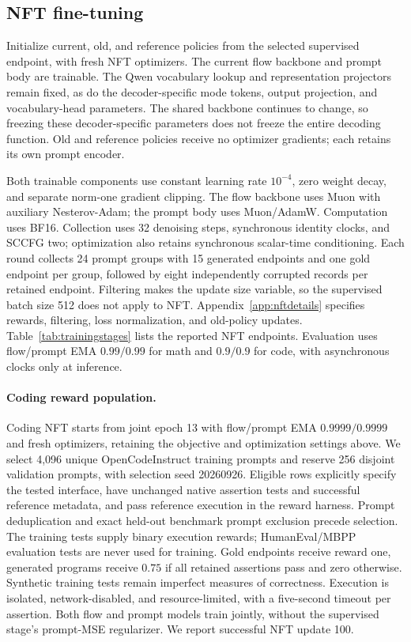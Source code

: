 \documentclass{article}
\begin{document}
\subsection{NFT fine-tuning}
\label{app:nfttraining}

Initialize current, old, and reference policies from the selected supervised endpoint, with fresh NFT optimizers. The current flow backbone and prompt body are trainable. The Qwen vocabulary lookup and representation projectors remain fixed, as do the decoder-specific mode tokens, output projection, and vocabulary-head parameters. The shared backbone continues to change, so freezing these decoder-specific parameters does not freeze the entire decoding function. Old and reference policies receive no optimizer gradients; each retains its own prompt encoder.

Both trainable components use constant learning rate $10^{-4}$, zero weight decay, and separate norm-one gradient clipping. The flow backbone uses Muon with auxiliary Nesterov-Adam; the prompt body uses Muon/AdamW. Computation uses BF16. Collection uses 32 denoising steps, synchronous identity clocks, and SCCFG two; optimization also retains synchronous scalar-time conditioning. Each round collects 24 prompt groups with 15 generated endpoints and one gold endpoint per group, followed by eight independently corrupted records per retained endpoint. Filtering makes the update size variable, so the supervised batch size 512 does not apply to NFT. Appendix~\ref{app:nftdetails} specifies rewards, filtering, loss normalization, and old-policy updates. Table~\ref{tab:trainingstages} lists the reported NFT endpoints. Evaluation uses flow/prompt EMA $0.99/0.99$ for math and $0.9/0.9$ for code, with asynchronous clocks only at inference.

\paragraph{Coding reward population.}
Coding NFT starts from joint epoch 13 with flow/prompt EMA $0.9999/0.9999$ and fresh optimizers, retaining the objective and optimization settings above. We select 4,096 unique OpenCodeInstruct training prompts and reserve 256 disjoint validation prompts, with selection seed 20260926. Eligible rows explicitly specify the tested interface, have unchanged native assertion tests and successful reference metadata, and pass reference execution in the reward harness. Prompt deduplication and exact held-out benchmark prompt exclusion precede selection. The training tests supply binary execution rewards; HumanEval/MBPP evaluation tests are never used for training. Gold endpoints receive reward one, generated programs receive $0.75$ if all retained assertions pass and zero otherwise. Synthetic training tests remain imperfect measures of correctness. Execution is isolated, network-disabled, and resource-limited, with a five-second timeout per assertion. Both flow and prompt models train jointly, without the supervised stage's prompt-MSE regularizer. We report successful NFT update 100.
\end{document}
